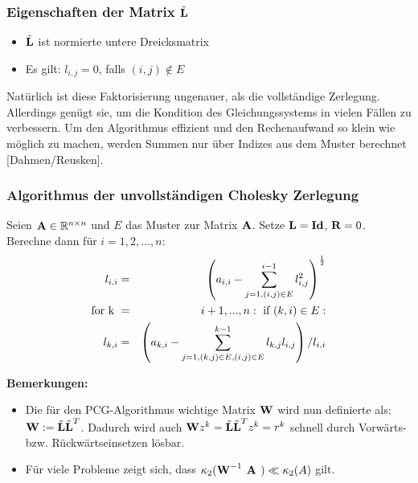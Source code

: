 \subsubsection{Eigenschaften der Matrix $\tilde{{\textbf{L}}}$}\label{sss.Eigenschaften L CZ}
\begin{itemize}
\item $\tilde{{\textbf{L}}}$ ist normierte untere Dreicksmatrix
\item Es gilt: $l_{i,j} = 0$, falls $(i,j) \notin E$
\end{itemize}

Natürlich ist diese Faktorisierung ungenauer, als die vollständige Zerlegung. Allerdings genügt sie, um die Kondition des Gleichungssystems in vielen Fällen zu verbessern. Um den Algorithmus effizient und den Rechenaufwand so klein wie möglich zu machen, werden Summen nur über Indizes aus dem Muster berechnet [Dahmen/Reusken].

\subsubsection{Algorithmus der unvollständigen Cholesky Zerlegung}\label{sss.Cholesky-Algorithmus}

Seien ${\textbf{A}} \in \mathbb{R}^{n \times n}$ und $E$ das Muster zur Matrix ${\textbf{A}}$. Setze ${\textbf{L}} = {\textbf{Id}}$, ${\textbf{R}} = 0$. Berechne dann für $i=1,2,...,n$:
\begin{eqnarray}
l_{i,i} &=& \left( a_{i,i} - \sum^{i-1}_{j=1,(i,j) \in E} l_{i,j}^{2} \right)^{\frac {1} {2}} \\
\textnormal{for k } &=& i+1,...,n: \textnormal{ if } (k,i) \in E: \\
l_{k,i} &=& \left( a_{k,i} - \sum^{k-1}_{j=1,(k,j) \in E, (i,j) \in E} l_{k,j} l_{i,j} \right) / l_{i,i}
\end{eqnarray}

\textbf{Bemerkungen:}

\begin{itemize}
\item Die für den PCG-Algorithmus wichtige Matrix ${\textbf{W}}$ wird nun definierte als: ${\textbf{W}} := \tilde{{\textbf{L}}} \tilde{{\textbf{L}}}^{T}$. Dadurch wird auch ${\textbf{W}}z^{k} = \tilde{{\textbf{L}}} \tilde{{\textbf{L}}}^{T}z^{k} = r^{k}$ schnell durch Vorwärts- bzw. Rückwärtseinsetzen lösbar.
\item Für viele Probleme zeigt sich, dass $\kappa_{2}({\textbf{W}}^{-1} {\textbf{ {\textbf{A}} }}) \ll \kappa_{2} (A)$ gilt. \\
\end{itemize}


